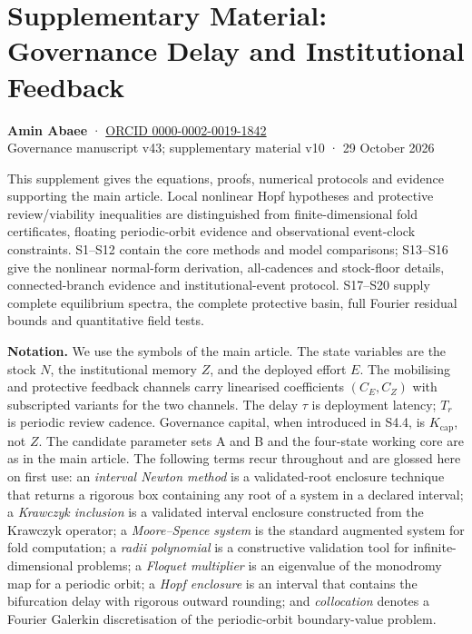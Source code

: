\documentclass[
  10pt,
  a4paper,
]{article}
\author{}
\date{}
\begin{document}
\section{Supplementary Material: Governance Delay and Institutional
Feedback}\label{supplementary-material-governance-delay-and-institutional-feedback}

\textbf{Amin Abaee} · \href{https://orcid.org/0000-0002-0019-1842}{ORCID
0000-0002-0019-1842}\\
Governance manuscript v43; supplementary material v10 · 29 October 2026

This supplement gives the equations, proofs, numerical protocols and
evidence supporting the main article. Local nonlinear Hopf hypotheses
and protective review/viability inequalities are distinguished from
finite-dimensional fold certificates, floating periodic-orbit evidence
and observational event-clock constraints. S1--S12 contain the core
methods and model comparisons; S13--S16 give the nonlinear normal-form
derivation, all-cadences and stock-floor details, connected-branch
evidence and institutional-event protocol. S17--S20 supply complete
equilibrium spectra, the complete protective basin, full Fourier
residual bounds and quantitative field tests.

\textbf{Notation.} We use the symbols of the main article. The state
variables are the stock \(N\), the institutional memory \(Z\), and the
deployed effort \(E\). The mobilising and protective feedback channels
carry linearised coefficients \((C_E, C_Z)\) with subscripted variants
for the two channels. The delay \(\tau\) is deployment latency; \(T_r\)
is periodic review cadence. Governance capital, when introduced in S4.4,
is \(K_{\mathrm{cap}}\), not \(Z\). The candidate parameter sets A and B
and the four-state working core are as in the main article. The
following terms recur throughout and are glossed here on first use: an
\emph{interval Newton method} is a validated-root enclosure technique
that returns a rigorous box containing any root of a system in a
declared interval; a \emph{Krawczyk inclusion} is a validated interval
enclosure constructed from the Krawczyk operator; a \emph{Moore--Spence
system} is the standard augmented system for fold computation; a
\emph{radii polynomial} is a constructive validation tool for
infinite-dimensional problems; a \emph{Floquet multiplier} is an
eigenvalue of the monodromy map for a periodic orbit; a \emph{Hopf
enclosure} is an interval that contains the bifurcation delay with
rigorous outward rounding; and \emph{collocation} denotes a Fourier
Galerkin discretisation of the periodic-orbit boundary-value problem.
\end{document}
